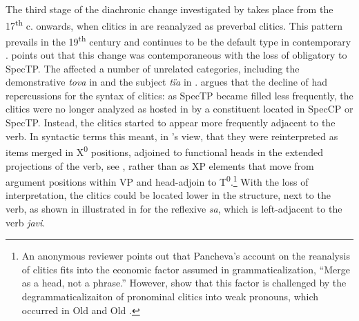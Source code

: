 \documentclass[output=paper,modfonts,newtxmath,hidelinks]{langscibook}
\begin{document}
The third stage of the diachronic change investigated by \citeauthor{pancheva2005} takes place from the 17\textsuperscript{th} c. onwards, when  clitics in  are reanalyzed as preverbal clitics. This pattern prevails in the 19\textsuperscript{th} century and continues to be the default  type in contemporary . \citeauthor{pancheva2005} points out that this change was contemporaneous with the loss of obligatory  to SpecTP. The  affected a number of unrelated categories, including the demonstrative \textit{tova} in  and the subject \textit{tïa} in . \citeauthor{pancheva2005} argues that the decline of  had repercussions for the syntax of clitics: as SpecTP became filled less frequently, the clitics were no longer analyzed as hosted in  by a constituent located in SpecCP or SpecTP. Instead, the clitics started to appear more frequently adjacent to the verb. In syntactic terms this meant, in \citeauthor{pancheva2005}’s view, that they were reinterpreted as items merged in X\textsuperscript{0} positions, adjoined to functional heads in the extended projections of the verb, see , rather than as XP elements that move from argument positions within VP and head-adjoin to T\textsuperscript{0}.\footnote{\label{11:fn2}An anonymous reviewer points out that Pancheva’s account on the reanalysis of clitics fits into the economic factor assumed in grammaticalization, “Merge as a head, not a phrase.” However, \citet{jung-migdalski2015} show that this factor is challenged by the degrammaticalizaiton of pronominal clitics into weak pronouns, which occurred in Old  and Old .} With the loss of  interpretation, the clitics could be located lower in the structure, next to the verb, as shown in illustrated in  for the reflexive  \textit{sa}, which is left-adjacent to the verb \textit{javi}. 

\ea \label{11:ex5}
	 \label{11:ex5a}
	 \label{11:ex5b}
	\z
\z
\end{document}
